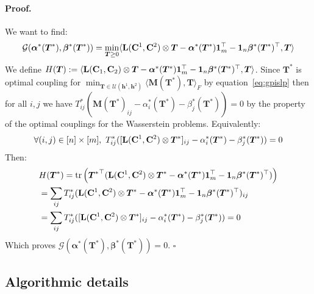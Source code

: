 \documentclass{article}
\newcommand{\scalar}[2]{\langle #1 , #2 \rangle}
\def\eqref#1{equation~\ref{#1}}
\def\vh{{\bm{h}}}
\def\mM{{\bm{M}}}
\def\mT{{\bm{T}}}
\def\alphab{\boldsymbol\alpha}
\def\betab{\boldsymbol\beta}
\def\L{{\bf L}}
\def\tr{{\text{tr}}}
\def\one{{\mathbf{1}}}
\newcommand{\C}{\mathbf{C}}
\begin{document}
	\paragraph{Proof.}
	We want to find:
	\begin{equation*}
	\begin{split}
	&\mathcal{G}(\alphab^{*}(\mT^{*}),\betab^{*}(\mT^{*}))= \min_{\mT \geq 0} \scalar{\L(\C^1,\C^2)\otimes \mT-\alphab^{*}(\mT^{*}) \one_m^{\top}- \one_n\betab^{*}(\mT^{*})^{\top}}{\mT}{} \\
	\end{split}
	\end{equation*}
	We define $H(\mT):=\scalar{\L(\C_1,\C_2)\otimes \mT-\alphab^{*}(\mT^{*}) \one_m^{\top}- \one_n\betab^{*}(\mT^{*})^{\top}}{\mT}{}$. Since $\mT^{*}$ is optimal coupling for $\min_{\mT \in \mathcal{U}(\vh^1,\vh^2)} \scalar{\mM(\mT^{*})}{\mT}_{F}$ by \eqref{eq:gpislp} then for all $i,j$ we have $T_{ij}^{*}(\mM(\mT^{*})_{ij}-\alpha_i^{*}(\mT^{*})-\beta_j^{*}(\mT^{*}))=0$ by the property of the optimal couplings for the Wasserstein problems. Equivalently: 
	\begin{equation}
	\begin{split}
	\forall (i,j) \in [n] \times [m], \ T_{ij}^{*}([\L(\C^1,\C^2)\otimes \mT^{*}]_{ij}-\alpha_i^{*}(\mT^{*})-\beta_j^{*}(\mT^{*}))=0
	\end{split}
	\end{equation}
	Then:
	\begin{equation}
	\begin{split}
	&H(\mT^{*})=\tr\left({\mT^{*}}^{\top}(\L(\C^1,\C^2)\otimes \mT^{*}-\alphab^{*}(\mT^{*}) \one_m^{\top}- \one_n\betab^{*}(\mT^{*})^{\top})\right) \\
	&=\sum_{ij} T^{*}_{ij} (\L(\C^1,\C^2)\otimes \mT^{*}-\alphab^{*}(\mT^{*}) \one_m^{\top}- \one_n\betab^{*}(\mT^{*})^{\top})_{ij} \\
	&=\sum_{ij} T^{*}_{ij} ([\L(\C^1,\C^2)\otimes \mT^{*}]_{ij}-\alpha_i^{*}(\mT^{*})-\beta_j^{*}(\mT^{*})) = 0
	\end{split}
	\end{equation}
	Which proves $\mathcal{G}(\alphab^{*}(\mT^{*}),\betab^{*}(\mT^{*}))=0$.
	$\square$
	
	
	\subsection{Algorithmic details}
\end{document}
